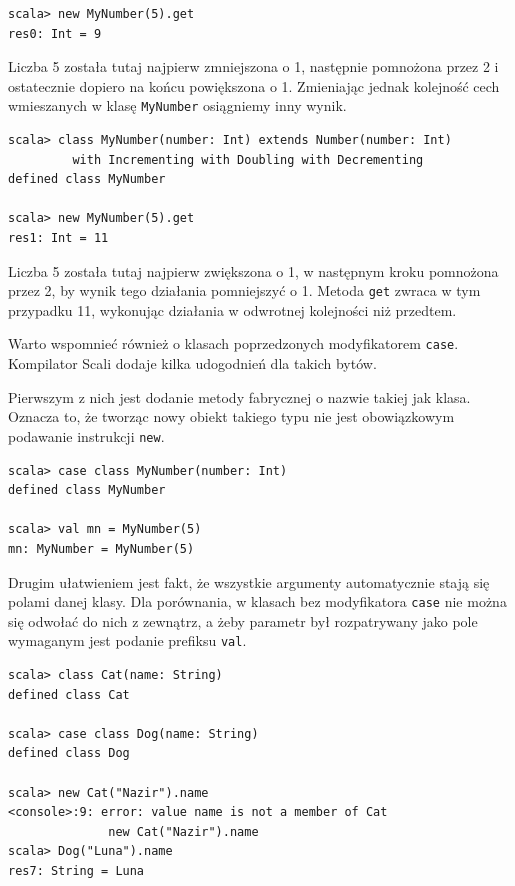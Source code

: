 \documentclass[brudnopis]{xmgr}
\begin{document}
\begin{verbatim}
scala> new MyNumber(5).get
res0: Int = 9
\end{verbatim}

Liczba 5 została tutaj najpierw zmniejszona o 1, następnie pomnożona przez 2 i ostatecznie dopiero na końcu powiększona o 1. Zmieniając jednak kolejność cech wmieszanych w klasę \texttt{MyNumber} osiągniemy inny wynik.

\begin{verbatim}
scala> class MyNumber(number: Int) extends Number(number: Int) 
         with Incrementing with Doubling with Decrementing
defined class MyNumber

scala> new MyNumber(5).get
res1: Int = 11
\end{verbatim}

Liczba 5 została tutaj najpierw zwiększona o 1, w następnym kroku pomnożona przez 2, by wynik tego działania pomniejszyć o 1. Metoda \texttt{get} zwraca w tym przypadku 11, wykonując działania w odwrotnej kolejności niż przedtem.

Warto wspomnieć również o klasach poprzedzonych modyfikatorem \texttt{case}. Kompilator Scali dodaje kilka udogodnień dla takich bytów. 

Pierwszym z nich jest dodanie metody fabrycznej o nazwie takiej jak klasa. Oznacza to, że tworząc nowy obiekt takiego typu nie jest obowiązkowym podawanie instrukcji \texttt{new}. 

\begin{verbatim}
scala> case class MyNumber(number: Int)
defined class MyNumber

scala> val mn = MyNumber(5)
mn: MyNumber = MyNumber(5)
\end{verbatim}

Drugim ułatwieniem jest fakt, że wszystkie argumenty automatycznie stają się polami danej klasy. Dla porównania, w klasach bez modyfikatora \texttt{case} nie można się odwołać do nich z zewnątrz, a żeby parametr był rozpatrywany jako pole wymaganym jest podanie prefiksu \texttt{val}.

\begin{verbatim}
scala> class Cat(name: String)
defined class Cat

scala> case class Dog(name: String)
defined class Dog

scala> new Cat("Nazir").name
<console>:9: error: value name is not a member of Cat
              new Cat("Nazir").name
scala> Dog("Luna").name
res7: String = Luna           
\end{verbatim}
\end{document}
